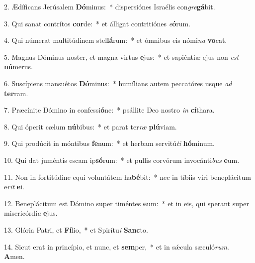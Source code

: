 2. Ædíficans Jerúsalem \textbf{Dó}minus:~*  dispersiónes Israélis con\textit{gre}\textbf{gá}bit.\

3. Qui sanat contrítos \textbf{cor}de:~*  et álligat contritiónes \textit{e}\textbf{ó}rum.\

4. Qui númerat multitúdinem stel\textbf{lá}rum:~*  et ómnibus eis nómi\textit{na} \textbf{vo}cat.\

5. Magnus Dóminus noster, et magna virtus \textbf{e}jus:~*  et sapiéntiæ ejus non \textit{est} \textbf{nú}merus.\

6. Suscípiens mansuétos \textbf{Dó}minus:~*  humílians autem peccatóres usque \textit{ad} \textbf{ter}ram.\

7. Præcínite Dómino in confessi\textbf{ó}ne:~*  psállite Deo nostro \textit{in} \textbf{cí}thara.\

8. Qui óperit cælum \textbf{nú}bibus:~*  et parat ter\textit{ræ} \textbf{plú}viam.\

9. Qui prodúcit in móntibus \textbf{fe}num:~*  et herbam servitú\textit{ti} \textbf{hó}minum.\

10. Qui dat juméntis escam ip\textbf{só}rum:~*  et pullis corvórum invocánti\textit{bus} \textbf{e}um.\

11. Non in fortitúdine equi voluntátem ha\textbf{bé}bit:~*  nec in tíbiis viri beneplácitum e\textit{rit} \textbf{e}i.\

12. Beneplácitum est Dómino super timéntes \textbf{e}um:~*  et in eis, qui sperant super misericórdi\textit{a} \textbf{e}jus.\

13. Glória Patri, et \textbf{Fí}lio,~*  et Spirítu\textit{i} \textbf{Sanc}to.\

14. Sicut erat in princípio, et nunc, et \textbf{sem}per,~*  et in sǽcula sæculó\textit{rum}. \textbf{A}men.\

